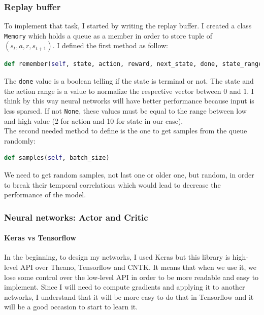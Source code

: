 \documentclass{article}
\begin{document}
\subsubsection{Replay buffer}

To implement that task, I started by writing the replay buffer. I created a
class \verb?Memory? which holds a queue as a member in order to store tuple of
$(s_t, a, r, s_{t+1})$. I defined the first method as follow:

\begin{lstlisting}[language=Python]
def remember(self, state, action, reward, next_state, done, state_range=None, action_range=None)
\end{lstlisting}

The \verb?done? value is a boolean telling if the state is terminal or not. The
state and the action range is a value to normalize the respective vector between
0 and 1. I think by this way neural networks will have better performance
because input is less sparsed. If not \verb?None?, these values must be equal to
the range between low and high value (2 for action and 10 for state in our
case).\\
The second needed method to define is the one to get samples from the queue randomly:

\begin{lstlisting}[language=Python]
def samples(self, batch_size)
\end{lstlisting}

We need to get random samples, not last one or older one, but random, in order to
break their temporal correlations which would lead to decrease the performance
of the model.

\subsubsection{Neural networks: Actor and Critic}

\paragraph{Keras vs Tensorflow}

In the beginning, to design my networks, I used Keras but this library is
high-level API over Theano, Tensorflow and CNTK. It means that when we use it,
we lose some control over the low-level API in order to be more readable and
easy to implement. Since I will need to compute gradients and applying it to
another networks, I understand that it will be more easy to do that in
Tensorflow and it will be a good occasion to start to learn it.
\end{document}
